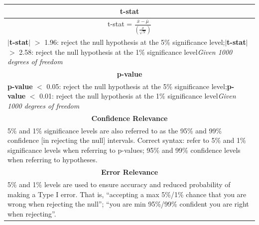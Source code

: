\documentclass[11pt, english]{article}
\begin{document}
	\begin{table}[h]
                \scriptsize
                \renewcommand{\arraystretch}{1.25}
        \begin{center}
        \begin{tabular}{p{13cm}}
                \hline
                \multicolumn{1}{c}{\textbf{t-stat}}\\
                \hline
                \multicolumn{1}{c}{t-stat = $\mathit{\frac{\bar{x}-\bar{\mu}}{\left(\frac{\sigma}{\sqrt{N}}\right)}}$}\\
                \textbf{$|$t-stat$|$} $>$ 1.96: reject the null hypothesis at the 5\% significance level;\newline \textbf{$|$t-stat$|$} $>$ 2.58: reject the null hypothesis at the 1\% significance level\newline \textit{Given 1000 degrees of freedom}\\
                \hline
                \multicolumn{1}{c}{\textbf{p-value}}\\
                \hline
                \textbf{p-value} $<$ 0.05: reject the null hypothesis at the 5\% significance level;\newline \textbf{p-value} $<$ 0.01: reject the null hypothesis at the 1\% significance level\newline \textit{Given 1000 degrees of freedom}\\
                \hline
                \multicolumn{1}{c}{\textbf{Confidence Relevance}}\\
                \hline
                5\% and 1\% significance levels are also referred to as the 95\% and 99\% confidence [in rejecting the null] intervals. Correct syntax: refer to 5\% and 1\% significance levels when referring to p-values; 95\% and 99\% confidence levels when referring to hypotheses.\\
                \hline
                \multicolumn{1}{c}{\textbf{Error Relevance}}\\
                \hline
                5\% and 1\% levels are used to ensure accuracy and reduced probability of making a Type I error. That is, ``accepting a max 5\%/1\% chance that you are wrong when rejecting the null”; ``you are min 95\%/99\% confident you are right when rejecting”.\\
                \hline
        \end{tabular}
        \end{center}
        \end{table}
\end{document}
